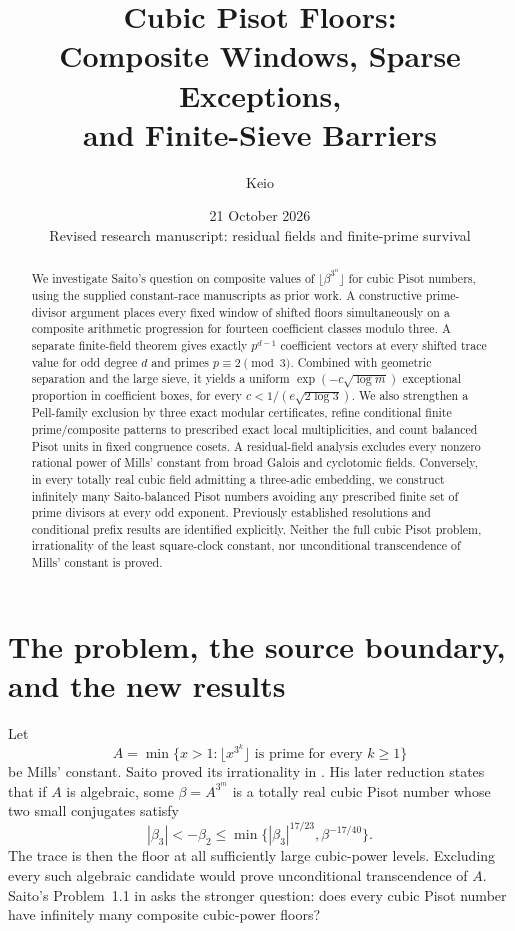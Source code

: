 \documentclass[11pt,a4paper]{article}
\title{Cubic Pisot Floors:\\Composite Windows, Sparse Exceptions,\\and Finite-Sieve Barriers}
\author{Keio}
\date{21 October 2026\\\small Revised research manuscript: residual fields and finite-prime survival}
\theoremstyle{remark}\newtheorem{remark}[theorem]{Remark}
\begin{document}
\maketitle
\begin{abstract}
We investigate Saito's question on composite values of
$\lfloor\beta^{3^n}\rfloor$ for cubic Pisot numbers, using the
supplied constant-race manuscripts as prior work. A constructive
prime-divisor argument places every fixed window of shifted floors
simultaneously on a composite arithmetic progression for fourteen
coefficient classes modulo three. A separate finite-field theorem
gives exactly $p^{d-1}$ coefficient vectors at every shifted trace
value for odd degree $d$ and primes $p\equiv2\pmod3$. Combined with
geometric separation and the large sieve, it yields a uniform
$\exp(-c\sqrt{\log m})$ exceptional proportion in coefficient boxes,
for every $c<1/(e\sqrt{2\log3})$. We also strengthen a Pell-family
exclusion by three exact modular certificates, refine conditional
finite prime/composite patterns to prescribed exact local
multiplicities, and count balanced Pisot units in fixed congruence
cosets. A residual-field analysis excludes every nonzero rational power
of Mills' constant from broad Galois and cyclotomic fields. Conversely,
in every totally real cubic field admitting a three-adic embedding,
we construct infinitely many Saito-balanced Pisot numbers avoiding
any prescribed finite set of prime divisors at every odd exponent.
Previously established resolutions and conditional prefix
results are identified explicitly. Neither the full cubic Pisot
problem, irrationality of the least square-clock constant, nor
unconditional transcendence of Mills' constant is proved.
\end{abstract}


\section{The problem, the source boundary, and the new results}
Let
\[
 A=\min\{x>1:\lfloor x^{3^k}\rfloor\text{ is prime for every }k\ge1\}
\]
be Mills' constant. Saito proved its irrationality in
\cite{SaitoIrrational}. His later reduction \cite[Theorem~1.7]{SaitoVariants} states that if $A$ is
algebraic, some $\beta=A^{3^m}$ is a totally real cubic Pisot number
whose two small conjugates satisfy
\begin{equation}\label{eq:saitobounds}
 |\beta_3|<-\beta_2\le
 \min\{|\beta_3|^{17/23},\beta^{-17/40}\}.
\end{equation}
The trace is then the floor at all sufficiently large cubic-power
levels. Excluding every such algebraic candidate would prove
unconditional transcendence of $A$. Saito's Problem~1.1 in
\cite{SaitoIntervals} asks the stronger question: does every cubic
Pisot number have infinitely many composite cubic-power floors?
\end{document}
